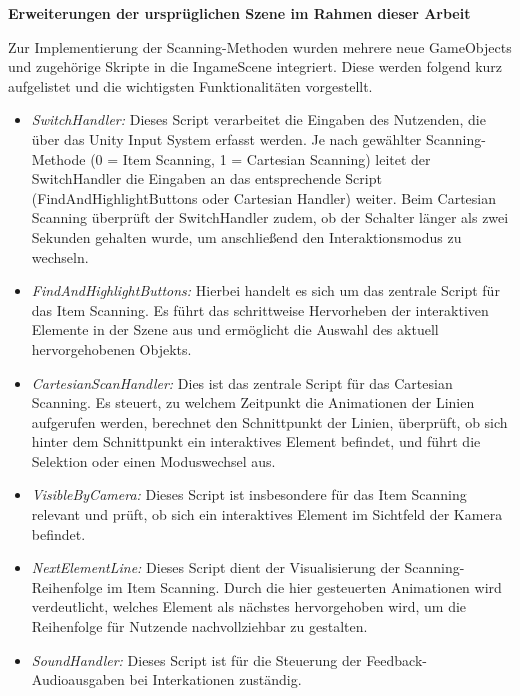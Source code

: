 {\normalfont \bfseries Erweiterungen der ursprüglichen Szene im Rahmen dieser Arbeit}

Zur Implementierung der Scanning-Methoden wurden mehrere neue GameObjects und zugehörige Skripte in die IngameScene integriert. Diese werden folgend kurz aufgelistet und die wichtigsten Funktionalitäten vorgestellt. 

\begin{itemize}
    \item \textit{SwitchHandler:}
    Dieses Script verarbeitet die Eingaben des Nutzenden, die über das Unity Input System erfasst werden. Je nach gewählter Scanning-Methode (0 = Item Scanning, 1 = Cartesian Scanning) leitet der SwitchHandler die Eingaben an das entsprechende Script (FindAndHighlightButtons oder Cartesian Handler) weiter. Beim Cartesian Scanning überprüft der SwitchHandler zudem, ob der Schalter länger als zwei Sekunden gehalten wurde, um anschließend den Interaktionsmodus zu wechseln.
    \item \textit{FindAndHighlightButtons:}
    Hierbei handelt es sich um das zentrale Script für das Item Scanning. Es führt das schrittweise Hervorheben der interaktiven Elemente in der Szene aus und ermöglicht die Auswahl des aktuell hervorgehobenen Objekts.
    \item \textit{CartesianScanHandler:} 
    Dies ist das zentrale Script für das Cartesian Scanning. Es steuert, zu welchem Zeitpunkt die Animationen der Linien aufgerufen werden, berechnet den Schnittpunkt der Linien, überprüft, ob sich hinter dem Schnittpunkt ein interaktives Element befindet, und führt die Selektion oder einen Moduswechsel aus. 
    \item \textit{VisibleByCamera:}
    Dieses Script ist insbesondere für das Item Scanning relevant und prüft, ob sich ein interaktives Element im Sichtfeld der Kamera befindet.
    \item \textit{NextElementLine:} 
    Dieses Script dient der Visualisierung der Scanning-Reihenfolge im Item Scanning. Durch die hier gesteuerten Animationen wird verdeutlicht, welches Element als nächstes hervorgehoben wird, um die Reihenfolge für Nutzende nachvollziehbar zu gestalten.
    \item \textit{SoundHandler:}
    Dieses Script ist für die Steuerung der Feedback-Audioausgaben bei Interkationen zuständig.
\end{itemize}

